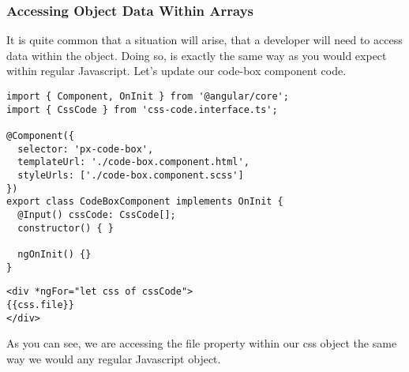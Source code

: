 \subsubsection{ Accessing Object Data Within Arrays }
It is quite common that a situation will arise, that a developer will need to 
access data within the object. Doing so, is exactly the same way as you would 
expect within regular Javascript. Let's update our code-box component code. 
\begin{lstlisting}[caption=px-code-box.component.ts]
import { Component, OnInit } from '@angular/core';
import { CssCode } from 'css-code.interface.ts';

@Component({
  selector: 'px-code-box',
  templateUrl: './code-box.component.html',
  styleUrls: ['./code-box.component.scss']
})
export class CodeBoxComponent implements OnInit {
  @Input() cssCode: CssCode[];
  constructor() { }

  ngOnInit() {}
} 
\end{lstlisting}
  
\begin{lstlisting}[caption=px-code-box.component.html]
<div *ngFor="let css of cssCode">
{{css.file}}
</div>   
\end{lstlisting} 

As you can see, we are accessing the file property within our css object the
same way we would any regular Javascript object.

